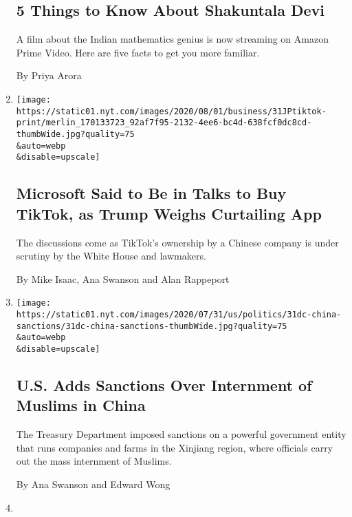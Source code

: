 \begin{enumerate}
{  \subsection{5 Things to Know About Shakuntala
  Devi}\label{5-things-to-know-about-shakuntala-devi}}

  A film about the Indian mathematics genius is now streaming on Amazon
  Prime Video. Here are five facts to get you more familiar.

  By Priya Arora
\item
  \href{/2020/07/31/technology/tiktok-microsoft.html}{}

  \texttt{[image: https://static01.nyt.com/images/2020/08/01/business/31JPtiktok-print/merlin\_170133723\_92af7f95-2132-4ee6-bc4d-638fcf0dc8cd-thumbWide.jpg?quality=75\\\&auto=webp\\\&disable=upscale]}

  \hypertarget{microsoft-said-to-be-in-talks-to-buy-tiktok-as-trump-weighs-curtailing-app}{%
  \subsection{Microsoft Said to Be in Talks to Buy TikTok, as Trump
  Weighs Curtailing
  App}\label{microsoft-said-to-be-in-talks-to-buy-tiktok-as-trump-weighs-curtailing-app}}

  The discussions come as TikTok's ownership by a Chinese company is
  under scrutiny by the White House and lawmakers.

  By Mike Isaac, Ana Swanson and Alan Rappeport
\item
  \href{/2020/07/31/us/politics/sanctions-china-xinjiang-uighurs.html}{}

  \texttt{[image: https://static01.nyt.com/images/2020/07/31/us/politics/31dc-china-sanctions/31dc-china-sanctions-thumbWide.jpg?quality=75\\\&auto=webp\\\&disable=upscale]}

  \hypertarget{us-adds-sanctions-over-internment-of-muslims-in-china}{%
  \subsection{U.S. Adds Sanctions Over Internment of Muslims in
  China}\label{us-adds-sanctions-over-internment-of-muslims-in-china}}

  The Treasury Department imposed sanctions on a powerful government
  entity that runs companies and farms in the Xinjiang region, where
  officials carry out the mass internment of Muslims.

  By Ana Swanson and Edward Wong
\item
  \href{/2020/07/31/business/britain-economic-comeback-suburbs.html}{}


\end{enumerate}
